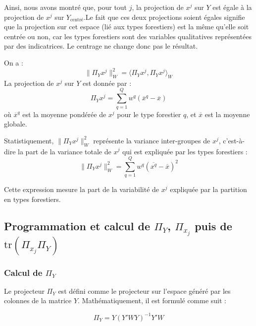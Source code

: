 \documentclass[
]{article}
\begin{document}
Ainsi, nous avons montré que, pour tout \(j\), la projection de \(x^j\)
sur \(Y\) est égale à la projection de \(x^j\) sur
\(Y_{\text{centré}}\).\newline Le fait que ces deux projections soient
égales signifie que la projection sur cet espace (lié aux types
forestiers) est la même qu'elle soit centrée ou non, car les types
forestiers sont des variables qualitatives représentées par des
indicatrices. Le centrage ne change donc pas le résultat.

On a : \[
\| \Pi_Y x^j \|_W^2 = \langle \Pi_Y x^j, \Pi_Y x^j \rangle_W
\] La projection de \(x^j\) sur \(Y\) est donnée par : \[
\Pi_Y x^j = \sum_{q=1}^{Q} w^q (\overline{x}^q - \overline{x})
\] où \(\overline{x}^q\) est la moyenne pondérée de \(x^j\) pour le type
forestier \(q\), et \(\overline{x}\) est la moyenne globale.

Statistiquement, \(\| \Pi_Y x^j \|_W^2\) représente la variance
inter-groupes de \(x^j\), c'est-à-dire la part de la variance totale de
\(x^j\) qui est expliquée par les types forestiers : \[
\| \Pi_Y x^j \|_W^2 = \sum_{q=1}^{Q} w^q (\overline{x^q} - \overline{x})^2
\]

Cette expression mesure la part de la variabilité de \(x^j\) expliquée
par la partition en types forestiers.

\hypertarget{programmation-et-calcul-de-pi_y-pi_x_j-puis-de-texttrpi_x_j-pi_y}{%
\subsection{\texorpdfstring{Programmation et calcul de \(\Pi_Y\),
\(\Pi_{x_j}\) puis de
\(\text{tr}(\Pi_{x_j} \Pi_Y)\)}{Programmation et calcul de \textbackslash Pi\_Y, \textbackslash Pi\_\{x\_j\} puis de \textbackslash text\{tr\}(\textbackslash Pi\_\{x\_j\} \textbackslash Pi\_Y)}}\label{programmation-et-calcul-de-pi_y-pi_x_j-puis-de-texttrpi_x_j-pi_y}}

\hypertarget{calcul-de-pi_y}{%
\subsubsection{\texorpdfstring{Calcul de
\(\Pi_Y\)}{Calcul de \textbackslash Pi\_Y}}\label{calcul-de-pi_y}}

Le projecteur \(\Pi_Y\) est défini comme le projecteur sur l'espace
généré par les colonnes de la matrice \(Y\). Mathématiquement, il est
formulé comme suit :

\[
   \Pi_Y = Y \left( Y' W Y \right)^{-1} Y' W
   \]
\end{document}
